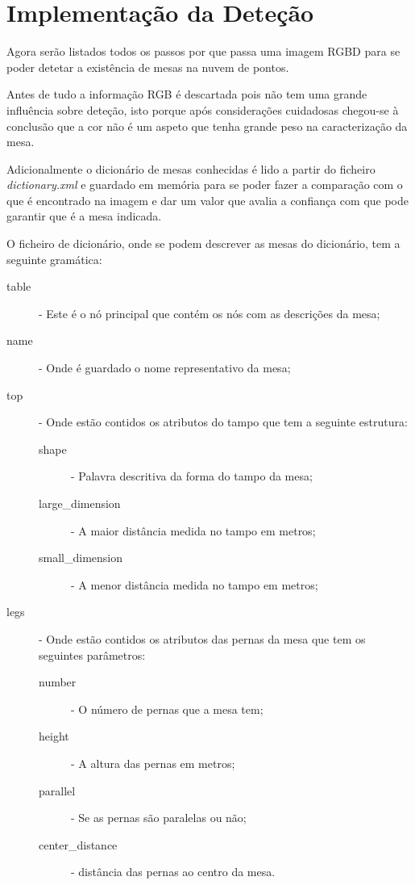 \vspace*{12mm}


\section {Implementação da Deteção}

Agora serão listados todos os passos por que passa uma imagem RGBD para se poder detetar a existência de mesas na nuvem de pontos.

Antes de tudo a informação RGB é descartada pois não tem uma grande influência sobre deteção, isto porque após considerações cuidadosas chegou-se à conclusão que a cor não é um aspeto que tenha grande peso na caracterização da mesa.

Adicionalmente o dicionário de mesas conhecidas é lido a partir do ficheiro \emph{dictionary.xml} e guardado em memória para se poder fazer a comparação com o que é encontrado na imagem e dar um valor que avalia a confiança com que pode garantir que é a mesa indicada.

O ficheiro de dicionário, onde se podem descrever as mesas do dicionário, tem a seguinte gramática:

\begin{description}
	\item [table] - Este é o nó principal que contém os nós com as descrições da mesa;
	\item [name] - Onde é guardado o nome representativo da mesa;
	\item [top] - Onde estão contidos os atributos do tampo que tem a seguinte estrutura:
	\begin{description} 
		\item [shape] - Palavra descritiva da forma do tampo da mesa;
		\item [large\_dimension] - A maior distância medida no tampo em metros; 
		\item [small\_dimension] - A menor distância medida no tampo em metros;
	\end{description} 
	\item [legs] - Onde estão contidos os atributos das pernas da mesa que tem os seguintes parâmetros:
	\begin{description} 
		\item [number] - O número de pernas que a mesa tem;
		\item [height] -  A altura das pernas em metros;
		\item [parallel] - Se as pernas são paralelas ou não;
		\item [center\_distance] - distância das pernas ao centro da mesa.
	\end{description} 
\end{description}

